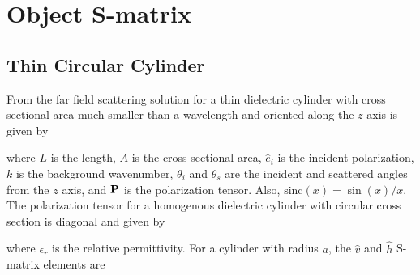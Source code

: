 

\section{Object S-matrix}

\subsection{Thin Circular Cylinder}

From \cite{sarabandi1990low, stiles1996scattering} the far field scattering solution for a thin dielectric cylinder with cross sectional area much smaller than a wavelength and oriented along the $z$ axis is given by 

\noindent where $L$ is the length, $A$ is the cross sectional area, $\hat{e}_i$ is the incident polarization, $k$ is the background wavenumber, $\theta_i$ and $\theta_s$ are the incident and scattered angles from the $z$ axis, and $\mathbf{P}$ is the polarization tensor. Also, $\textrm{sinc}(x) = \sin(x)/x$. The polarization tensor for a homogenous dielectric cylinder with circular cross section is diagonal and given by 

\noindent where $\epsilon_r$ is the relative permittivity. For a cylinder with radius $a$, the $\hat{v}$ and $\hat{h}$ S-matrix elements are 


